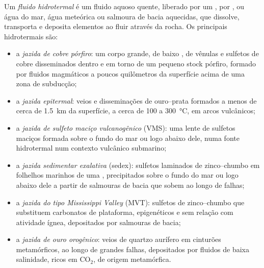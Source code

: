 \begin{definition}\label{def:b2:ore-deposits:hydrothermal}
Um \emph{fluido hidrotermal} é um fluido aquoso quente, liberado por um ,
por , ou água do mar, água meteórica ou salmoura de bacia aquecidas, que dissolve,
transporta e deposita elementos ao fluir através da rocha. Os principais  hidrotermais
são:
\begin{itemize}
  \item a \emph{jazida de cobre pórfiro}: um corpo grande, de baixo ,
        de vênulas e sulfetos de cobre disseminados dentro e em torno de um pequeno stock pórfiro, formado por
        fluidos magmáticos a poucos quilômetros da superfície acima de uma zona de subducção;
  \item a \emph{jazida epitermal}: veios e
        disseminações de ouro--prata formados a menos de cerca de \qty{1.5}{km} da superfície, a cerca de 100 a
        \qty{300}{\celsius}, em arcos vulcânicos;
  \item a \emph{jazida de sulfeto maciço vulcanogênico}
        (VMS): uma lente de sulfetos maciços formada sobre o fundo do mar ou logo abaixo dele, numa fonte
        hidrotermal num contexto vulcânico submarino;
  \item a \emph{jazida sedimentar exalativa} (sedex):
        sulfetos laminados de zinco--chumbo em folhelhos marinhos de uma , precipitados sobre o fundo do mar ou logo
        abaixo dele a partir de salmouras de bacia que sobem ao longo de falhas;
  \item a \emph{jazida do tipo Mississippi Valley} (MVT):
        sulfetos de zinco--chumbo que substituem carbonatos de plataforma, epigenéticos e sem relação com atividade
        ígnea, depositados por salmouras de bacia;
  \item a \emph{jazida de ouro orogênico}: veios de quartzo aurífero em
        cinturões metamórficos, ao longo de grandes falhas, depositados por fluidos de baixa salinidade, ricos em CO$_2$, de
        origem metamórfica.
\end{itemize}
\end{definition}

